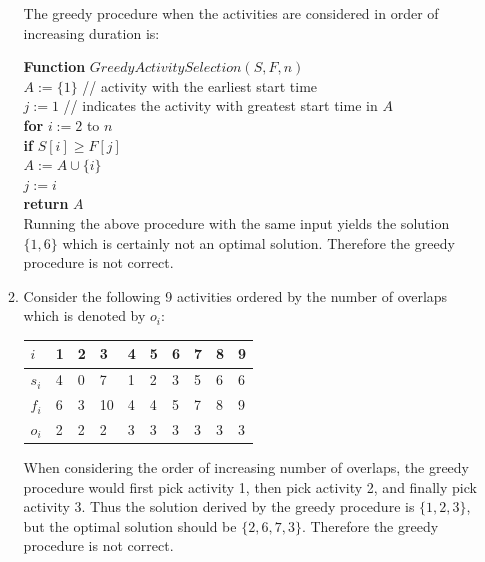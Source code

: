 \documentclass[11pt]{article}
\begin{document}
\begin{enumerate}
\begin{enumerate}
The greedy procedure when the activities are considered in order of
increasing duration is:

\textbf{Function} $GreedyActivitySelection(S, F, n)$\\
\-\hspace{3em} $A := \{1\}$ // activity with the earliest start time\\
\-\hspace{3em} $j := 1$ // indicates the activity with greatest start time in $A$\\
\-\hspace{3em} \textbf{for} $i := 2$ to $n$ \\
\-\hspace{5em} \textbf{if} $S[i] \geq F[j]$ \\
\-\hspace{7em} $A := A \cup \{i\}$ \\
\-\hspace{7em} $j := i$ \\
\-\hspace{3em} \textbf{return} $A$ \\

Running the above procedure with the same input yields the solution
$\{1,6\}$ which is certainly not an optimal solution. Therefore the
greedy procedure is not correct.

\item Consider the following 9 activities ordered by the number of
  overlaps which is denoted by $o_i$:\\

\begin{tabular}{ l | l l l l l l l l l }
  $i$ & 1 & 2 & 3 & 4 & 5 & 6 & 7 & 8 & 9\\ \hline
  $s_i$ & 4 & 0 & 7 & 1 & 2 & 3 & 5 & 6 & 6\\
  $f_i$ & 6 & 3 & 10 & 4 & 4 & 5 & 7 & 8 & 9\\
  $o_i$ & 2 & 2 & 2 & 3 & 3 & 3 & 3 & 3 & 3\\
\end{tabular}

When considering the order of increasing number of overlaps, the
greedy procedure would first pick activity 1, then pick activity 2,
and finally pick activity 3.
Thus the solution derived by the greedy procedure is $\{1,2,3\}$, but the
optimal solution should be $\{2,6,7,3\}$. Therefore the
greedy procedure is not correct.

\end{enumerate}


\end{enumerate}
\end{document}
